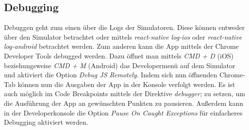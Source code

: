 \subsection{Debugging}
Debuggen geht zum einen über die Logs der Simulatoren. Diese können entweder über den Simulator betrachtet oder mittels \textit{react-native log-ios} oder \textit{react-native log-android} betrachtet werden. Zum anderen kann die App mittels der Chrome Developer Tools debugged werden. Dazu öffnet man mittels \textit{CMD + D} (iOS) beziehungsweise \textit{CMD + M} (Android) das Developermenü auf dem Simulator und aktiviert die Option \textit{Debug JS Remotely}. Indem sich nun öffnenden Chrome-Tab können nun die Ausgaben der App in der Konsole verfolgt werden. Es ist auch möglich im Code Breakpoints mittels der Direktive \textit{debugger;} zu setzen, um die Ausführung der App an gewünschten Punkten zu pausieren.  Außerdem kann in der Developerkonsole die Option \textit{Pause On Caught Exceptions} für einfacheres Debugging aktiviert werden.